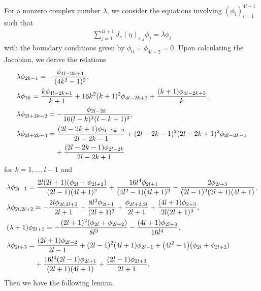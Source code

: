 \documentclass[10pt,a4paper]{amsart}
\numberwithin{equation}{section}
\begin{document}
For a nonzero complex number $\lambda$, we consider the equations involving $(\phi_i)_{i=1}^{4l+1}$ such that
	\begin{align}\label{Beq}
	\sum_{j=1}^{4l+1}J_\gamma(\eta)_{i,j}\phi_j=\lambda\phi_i
	\end{align}
with the boundary conditions given by $\phi_0=\phi_{4l+2}=0$.
Upon calculating the Jacobian, we derive the relations
	\begin{align}
	\label{Br1}&\lambda\phi_{2k-1}=-\frac{\phi_{4l-2k+3}}{(4k^2-1)^2},\\
	\label{Br2}&\lambda\phi_{2k}=\frac{k\phi_{4l-2k+1}}{k+1}+16k^2(k+1)^2\phi_{4l-2k+2}+\frac{(k+1)\phi_{4l-2k+3}}{k},\\
	\label{Br3}&\lambda\phi_{2l+2k+2}=-\frac{\phi_{2l-2k}}{16(l-k)^2(l-k+1)^2},\\
&\lambda\phi_{2l+2k+3}=\frac{(2l-2k+1)\phi_{2l-2k-2}}{2l-2k-1}+(2l-2k-1)^2(2l-2k+1)^2\phi_{2l-2k-1}\nonumber\\
	&\hphantom{\lambda\phi_{2l+2k+3}=}{}+\frac{(2l-2k-1)\phi_{2l-2k}}{2l-2k+1}\label{Br4}
	\end{align}
for $k=1,\dots,l-1$ and
	\begin{align}
	\label{Br5}&\lambda\phi_{2l-1}=\frac{2l(2l+1)(\phi_{2l}+\phi_{2l+2})}{(2l-1)(4l+1)^2}+\frac{16l^4\phi_{2l+1}}{(4l^2-1)(4l+1)^2}-\frac{2\phi_{2l+3}}{(2l-1)^2(2l+1)(4l+1)},\\
	\label{Br6}&\lambda\phi_{2l,2l+2}=-\frac{2l\phi_{2l,2l+2}}{2l+1}+\frac{8l^3\phi_{2l+1}}{(2l+1)^3}+\frac{\phi_{2l+2,2l}}{2l+1}+\frac{(4l+1)\phi_{2+3}}{2l(2l+1)^3},\\
	\label{Br7}&(\lambda+1)\phi_{2l+1}=-\frac{(2l+1)^2(\phi_{2l}+\phi_{2l+2})}{8l^3}-\frac{(4l+1)\phi_{2l+3}}{16l^4},\\
&\lambda\phi_{2l+3}=\frac{(2l+1)\phi_{2l-2}}{2l-1}+(2l-1)^2(4l+1)\phi_{2l-1}+\bigl(4l^2-1\bigr)(\phi_{2l}+\phi_{2l+2})\nonumber\\
	&\hphantom{\lambda\phi_{2l+3}=}{}+\frac{16l^4(2l-1)\phi_{2l+1}}{(2l+1)(4l+1)}+\frac{(2l-1)\phi_{2l+3}}{2l+1}.\label{Br8}
	\end{align}
Then we have the following lemma.
\end{document}
